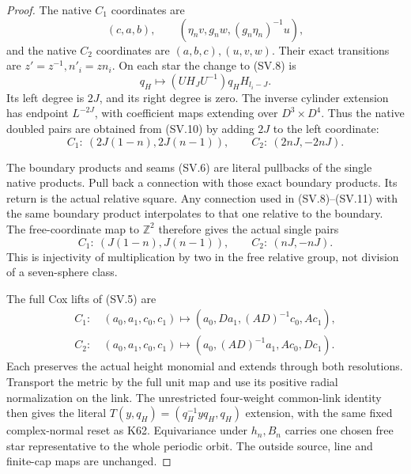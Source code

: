 \begin{proof}
The native \(C_1\) coordinates are
\[
 (c,a,b),\qquad
       (\eta_n v,g_nw,(g_n\eta_n)^{-1}u),
\]
and the native \(C_2\) coordinates are
\((a,b,c),(u,v,w)\). Their exact transitions are
\(z'=z^{-1},n'_i=zn_i\). On each star the change
to (SV.8) is
\[
                q_H\mapsto
                   (UH_JU^{-1})q_HH_{l_i-J}.         \tag{SV.11}
\]
Its left degree is \(2J\), and its right degree
is zero. The inverse cylinder extension has
endpoint \(L^{-2J}\), with coefficient maps
extending over \(D^3\times D^4\). Thus the native
doubled pairs are obtained from (SV.10) by adding
\(2J\) to the left coordinate:
\[
 C_1:\ (2J(1-n),2J(n-1)),\qquad
 C_2:\ (2nJ,-2nJ).                                   \tag{SV.12}
\]

The boundary products and seams (SV.6) are literal
pullbacks of the single native products. Pull back
a connection with those exact boundary products.
Its return is the actual relative square. Any
connection used in (SV.8)--(SV.11) with the same
boundary product interpolates to that one relative
to the boundary. The free-coordinate map to
\(\mathbb Z^2\) therefore gives the actual single
pairs
\[
 C_1:\ (J(1-n),J(n-1)),\qquad
 C_2:\ (nJ,-nJ).                                     \tag{SV.13}
\]
This is injectivity of multiplication by two in
the free relative group, not division of a
seven-sphere class.

The full Cox lifts of (SV.5) are
\[
 \begin{split}
 C_1:\ &(a_0,a_1,c_0,c_1)
       \mapsto(a_0,Da_1,(AD)^{-1}c_0,Ac_1),\\
 C_2:\ &(a_0,a_1,c_0,c_1)
       \mapsto(a_0,(AD)^{-1}a_1,Ac_0,Dc_1).
 \end{split}                                          \tag{SV.14}
\]
Each preserves the actual height monomial and
extends through both resolutions. Transport the
metric by the full unit map and use its positive
radial normalization on the link. The unrestricted
four-weight common-link identity then gives the
literal \(T(y,q_H)=(q_H^{-1}yq_H,q_H)\) extension,
with the same fixed complex-normal reset as K62.
Equivariance under \(h_n,B_n\) carries one chosen
free star representative to the whole periodic
orbit. The outside source, line and finite-cap
maps are unchanged.


\end{proof}
